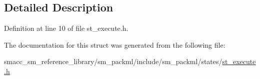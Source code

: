 \subsection{Detailed Description}


Definition at line 10 of file st\+\_\+execute.\+h.



The documentation for this struct was generated from the following file\+:\begin{DoxyCompactItemize}
\item 
smacc\+\_\+sm\+\_\+reference\+\_\+library/sm\+\_\+packml/include/sm\+\_\+packml/states/\hyperlink{st__execute_8h}{st\+\_\+execute.\+h}\end{DoxyCompactItemize}
